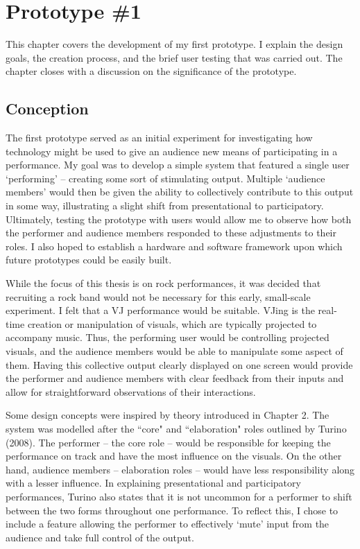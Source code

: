 \chapter{Prototype \#1}

This chapter covers the development of my first prototype. I explain the design goals, the creation process, and the brief user testing that was carried out. The chapter closes with a discussion on the significance of the prototype.

\section{Conception}

The first prototype served as an initial experiment for investigating how technology might be used to give an audience new means of participating in a performance. My goal was to develop a simple system that featured a single user `performing' -- creating some sort of stimulating output. Multiple `audience members' would then be given the ability to collectively contribute to this output in some way, illustrating a slight shift from presentational to participatory. Ultimately, testing the prototype with users would allow me to observe how both the performer and audience members responded to these adjustments to their roles. I also hoped to establish a hardware and software framework upon which future prototypes could be easily built.

While the focus of this thesis is on rock performances, it was decided that recruiting a rock band would not be necessary for this early, small-scale experiment. I felt that a VJ performance would be suitable. VJing is the real-time creation or manipulation of visuals, which are typically projected to accompany music. Thus, the performing user would be controlling projected visuals, and the audience members would be able to manipulate some aspect of them. Having this collective output clearly displayed on one screen would provide the performer and audience members with clear feedback from their inputs and allow for straightforward observations of their interactions.

Some design concepts were inspired by theory introduced in Chapter 2. The system was modelled after the ``core" and ``elaboration" roles outlined by Turino (2008). The performer -- the core role -- would be responsible for keeping the performance on track and have the most influence on the visuals. On the other hand, audience members -- elaboration roles -- would have less responsibility along with a lesser influence. In explaining presentational and participatory performances, Turino also states that it is not uncommon for a performer to shift between the two forms throughout one performance. To reflect this, I chose to include a feature allowing the performer to effectively `mute' input from the audience and take full control of the output.

